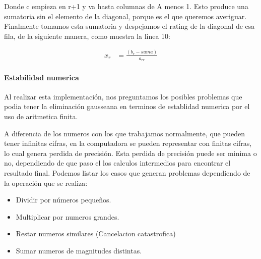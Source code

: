 \documentclass[a4paper]{article}
\begin{document}
Donde c empieza en r+1 y va hasta columnas de A menos 1. Esto produce una sumatoria sin el elemento de la diagonal, porque es el que queremos averiguar. Finalmente tomamos esta sumatoria y despejamos el rating de la diagonal de esa fila, de la siguiente manera, como muestra la linea 10:

\begin{align*}
x_{r} &= \frac{(b_{r} - suma)}{a_{rr}}
\end{align*}



\paragraph{Estabilidad numerica}

Al realizar esta implementación, nos preguntamos los posibles problemas que podia tener la eliminación gausseana en terminos de establidad numerica por el uso de aritmetica finita. 

A diferencia de los numeros con los que trabajamos normalmente, que pueden tener infinitas cifras, en la computadora se pueden representar con finitas cifras, lo cual genera perdida de precisión. Esta perdida de precisión puede ser minima o no, dependiendo de que paso el los calculos intermedios para encontrar el resultado final. Podemos listar los casos que generan problemas dependiendo de la operación que se realiza:

\begin{itemize}
    \item Dividir por números pequeños.
    \item Multiplicar por numeros grandes.
    \item Restar numeros similares (Cancelacion catastrofica)
    \item Sumar numeros de magnitudes distintas.
\end{itemize}
\end{document}
